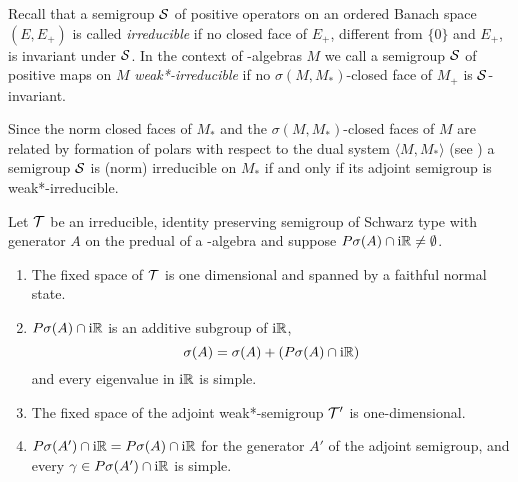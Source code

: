 Recall that a semigroup $\mathcal{S}$ of positive operators on an ordered Banach space $(E,E_{+})$ is called \emph{irreducible} if no closed face of $E_{+}$, different from $\{0\}$ and $E_{+}$, is invariant under $\mathcal{S}$.
In the context of \WA-algebras $M$ we call a semigroup $\mathcal{S}$ of positive maps on $M$ \emph{weak*-irreducible} if no $\sigma(M,M_{*})$-closed face of $M_{+}$ is $\mathcal{S}$-invariant.

Since the norm closed faces of $M_{*}$ and the $\sigma(M,M_{*})$-closed faces of $M$ are related by formation of polars with respect to the dual system $\langle M,M_{*} \rangle$ (see \citet[Theorem 3.6.11 and Theorem 3.10.7.]{pedersen:1979}) a semigroup $\mathcal{S}$ is (norm) irreducible on $M_{*}$ if and only if its adjoint semigroup is weak*-irreducible.
\begin{theorem}\label{thm:d3-1.11}
Let $\mathcal{T}$ be an irreducible, identity preserving semigroup of Schwarz type with generator $A$ on the predual of a \WA-algebra and suppose $P\sigma(A) \cap \mathrm{i}\mathbb{R} \neq \emptyset$.
\begin{enumerate}[\upshape (i)]
\item 
The fixed space of $\mathcal{T}$ is one dimensional and spanned by a faithful normal state.

\item 
$P\sigma(A) \cap \mathrm{i}\mathbb{R}$ is an additive subgroup of $\mathrm{i}\mathbb{R}$,
\[
\sigma(A) = \sigma(A) + (P\sigma(A) \cap \mathrm{i}\mathbb{R})
\]
and every eigenvalue in $\mathrm{i}\mathbb{R}$ is simple.

\item 
The fixed space of the adjoint weak*-semigroup $\mathcal{T}'$ is one-dimensional.

\item 
$P{\sigma}(A') \cap \mathrm{i}\mathbb{R} = P\sigma(A) \cap \mathrm{i}\mathbb{R}$ for the generator $A'$ of the adjoint semigroup, and every $\gamma \in P{\sigma}(A') \cap \mathrm{i}\mathbb{R}$ is simple.
\end{enumerate}
\end{theorem}

